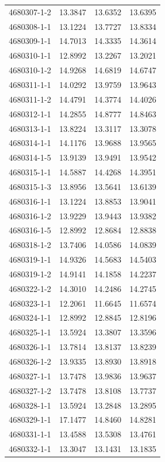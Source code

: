 \begin{longtable}{lrrr}
4680307-1-2 & 13.3847 & 13.6352 & 13.6395 \\
4680308-1-1 & 13.1224 & 13.7727 & 13.8334 \\
4680309-1-1 & 14.7013 & 14.3335 & 14.3614 \\
4680310-1-1 & 12.8992 & 13.2267 & 13.2021 \\
4680310-1-2 & 14.9268 & 14.6819 & 14.6747 \\
4680311-1-1 & 14.0292 & 13.9759 & 13.9643 \\
4680311-1-2 & 14.4791 & 14.3774 & 14.4026 \\
4680312-1-1 & 14.2855 & 14.8777 & 14.8463 \\
4680313-1-1 & 13.8224 & 13.3117 & 13.3078 \\
4680314-1-1 & 14.1176 & 13.9688 & 13.9565 \\
4680314-1-5 & 13.9139 & 13.9491 & 13.9542 \\
4680315-1-1 & 14.5887 & 14.4268 & 14.3951 \\
4680315-1-3 & 13.8956 & 13.5641 & 13.6139 \\
4680316-1-1 & 13.1224 & 13.8853 & 13.9041 \\
4680316-1-2 & 13.9229 & 13.9443 & 13.9382 \\
4680316-1-5 & 12.8992 & 12.8684 & 12.8838 \\
4680318-1-2 & 13.7406 & 14.0586 & 14.0839 \\
4680319-1-1 & 14.9326 & 14.5683 & 14.5403 \\
4680319-1-2 & 14.9141 & 14.1858 & 14.2237 \\
4680322-1-2 & 14.3010 & 14.2486 & 14.2745 \\
4680323-1-1 & 12.2061 & 11.6645 & 11.6574 \\
4680324-1-1 & 12.8992 & 12.8845 & 12.8196 \\
4680325-1-1 & 13.5924 & 13.3807 & 13.3596 \\
4680326-1-1 & 13.7814 & 13.8137 & 13.8239 \\
4680326-1-2 & 13.9335 & 13.8930 & 13.8918 \\
4680327-1-1 & 13.7478 & 13.9836 & 13.9637 \\
4680327-1-2 & 13.7478 & 13.8108 & 13.7737 \\
4680328-1-1 & 13.5924 & 13.2848 & 13.2895 \\
4680329-1-1 & 17.1477 & 14.8460 & 14.8281 \\
4680331-1-1 & 13.4588 & 13.5308 & 13.4761 \\
4680332-1-1 & 13.3047 & 13.1431 & 13.1835 \\

\end{longtable}

